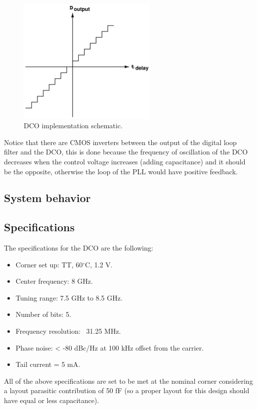 \begin{figure}[H]
    \centering
    \includegraphics[width=0.6\textwidth]{figures/TDC_shifted_characteristic.png}
    \caption{DCO implementation schematic.}
    \label{fig:DCO_implementation}
\end{figure}

Notice that there are CMOS inverters between the output of the digital loop filter and the DCO, this is done because the frequency of oscillation of the DCO decreases when the control voltage increases (adding 
capacitance) and it should be the opposite, otherwise the loop of the PLL would have positive feedback.

\subsection{System behavior}


\subsection{Specifications}
The specifications for the DCO are the following:
\begin{itemize}
    \item Corner set up: TT, 60$^{\circ}$C, 1.2 V.
    \item Center frequency: 8 GHz.
    \item Tuning range: 7.5 GHz to 8.5 GHz.
    \item Number of bits: 5.
    \item Frequency resolution: ~31.25 MHz.
    \item Phase noise: < -80 dBc/Hz at 100 kHz offset from the carrier.
    \item Tail current = 5 mA.
\end{itemize}
All of the above specifications are set to be met at the nominal corner considering a layout parasitic contribution of 50 fF (so a proper layout for this design should have equal or less capacitance). 


